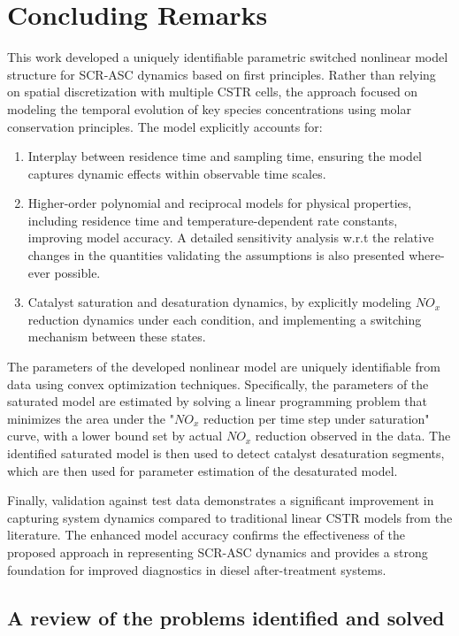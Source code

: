 \newpage
\section{Concluding Remarks}
This work developed a uniquely identifiable parametric switched nonlinear model structure for SCR-ASC dynamics based on
first principles. Rather than relying on spatial discretization with multiple CSTR cells, the approach focused on modeling the temporal evolution of key species concentrations using molar conservation principles. The model explicitly accounts for:

\begin{enumerate}
        \item Interplay between residence time and sampling time, ensuring the model captures dynamic effects within observable time scales.
        \item Higher-order polynomial and reciprocal models for physical properties, including residence time and temperature-dependent rate constants, improving model accuracy. A detailed sensitivity analysis w.r.t the relative changes in the quantities validating the assumptions is also presented where-ever possible.
        \item Catalyst saturation and desaturation dynamics, by explicitly modeling $NO_x$ reduction dynamics under each condition, and implementing a switching mechanism between these states.
\end{enumerate}

The parameters of the developed nonlinear model are uniquely identifiable from data using convex optimization
techniques. Specifically, the parameters of the saturated model are estimated by solving a linear programming problem
that minimizes the area under the "$NO_x$ reduction per time step under saturation" curve, with a lower bound set by
actual $NO_x$ reduction observed in the data. The identified saturated model is then used to detect catalyst
desaturation segments, which are then used for parameter estimation of the desaturated model.

Finally, validation against test data demonstrates a significant improvement in capturing system dynamics compared to
traditional linear CSTR models from the literature. The enhanced model accuracy confirms the effectiveness of the
proposed approach in representing SCR-ASC dynamics and provides a strong foundation for improved diagnostics in diesel
after-treatment systems.


\subsection{A review of the problems identified and solved}

